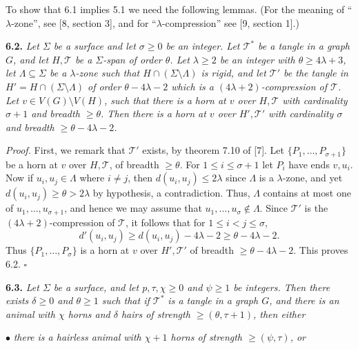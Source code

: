 To show that 6.1 implies 5.1 we need the following lemmas. (For the meaning of ``$\lambda$-zone'', see [8, section 3], and for ``$\lambda$-compression'' see [9, section 1].)

\textbf{6.2.} \textit{Let $\Sigma$ be a surface and let $\sigma \ge 0$ be an integer. Let $\mathcal{T}^*$ be a tangle in a graph $G$, and let $H, \mathcal{T}$ be a $\Sigma$-span of order $\theta$. Let $\lambda \ge 2$ be an integer with $\theta \ge 4\lambda + 3$, let $\Lambda \subseteq \Sigma$ be a $\lambda$-zone such that $H \cap (\Sigma \setminus \Lambda)$ is rigid, and let $\mathcal{T}'$ be the tangle in $H' = H \cap (\Sigma \setminus \Lambda)$ of order $\theta - 4\lambda - 2$ which is a $(4\lambda + 2)$-compression of $\mathcal{T}$. Let $v \in V(G) \setminus V(H)$, such that there is a horn at $v$ over $H, \mathcal{T}$ with cardinality $\sigma + 1$ and breadth $\ge \theta$. Then there is a horn at $v$ over $H', \mathcal{T}'$ with cardinality $\sigma$ and breadth $\ge \theta - 4\lambda - 2$.}

\textit{Proof.} First, we remark that $\mathcal{T}'$ exists, by theorem 7.10 of [7]. Let $\{P_1, \dots, P_{\sigma+1}\}$ be a horn at $v$ over $H, \mathcal{T}$, of breadth $\ge \theta$. For $1 \le i \le \sigma + 1$ let $P_i$ have ends $v, u_i$. Now if $u_i, u_j \in \Lambda$ where $i \ne j$, then $d(u_i, u_j) \le 2\lambda$ since $\Lambda$ is a $\lambda$-zone, and yet $d(u_i, u_j) \ge \theta > 2\lambda$ by hypothesis, a contradiction. Thus, $\Lambda$ contains at most one of $u_1, \dots, u_{\sigma+1}$, and hence we may assume that $u_1, \dots, u_\sigma \notin \Lambda$. Since $\mathcal{T}'$ is the $(4\lambda + 2)$-compression of $\mathcal{T}$, it follows that for $1 \le i < j \le \sigma$,
\begin{equation*}
d'(u_i, u_j) \ge d(u_i, u_j) - 4\lambda - 2 \ge \theta - 4\lambda - 2.
\end{equation*}
Thus $\{P_1, \dots, P_\sigma\}$ is a horn at $v$ over $H', \mathcal{T}'$ of breadth $\ge \theta - 4\lambda - 2$. This proves 6.2. $\square$

\textbf{6.3.} \textit{Let $\Sigma$ be a surface, and let $p, \tau, \chi \ge 0$ and $\psi \ge 1$ be integers. Then there exists $\delta \ge 0$ and $\theta \ge 1$ such that if $\mathcal{T}^*$ is a tangle in a graph $G$, and there is an animal with $\chi$ horns and $\delta$ hairs of strength $\ge (\theta, \tau + 1)$, then either}

\hspace*{12pt}$\bullet$ \textit{there is a hairless animal with $\chi + 1$ horns of strength $\ge (\psi, \tau)$, or}

